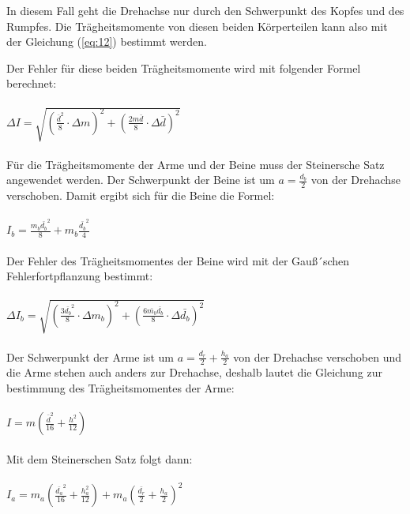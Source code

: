 In diesem Fall geht die Drehachse nur durch den Schwerpunkt des Kopfes und des Rumpfes.
Die Trägheitsmomente von diesen beiden Körperteilen kann also mit der Gleichung (\ref{eq:12})
bestimmt werden.

Der Fehler für diese beiden Trägheitsmomente wird mit folgender Formel berechnet:\\\\

$\Delta I = \sqrt{\left(\frac{\bar{d}^2}{8} \cdot \Delta m \right)^2
  + \left(\frac{2m\bar{d}}{8} \cdot \Delta \bar{d} \right)^2}$\\\\

Für die Trägheitsmomente der Arme und der Beine muss der Steinersche Satz angewendet
werden. Der Schwerpunkt der Beine ist um $a = \frac{d_b}{2}$ von der Drehachse verschoben.
Damit ergibt sich für die Beine die Formel:\\\\

$I_b = \frac{m_b \bar{d_b}^2}{8} + m_b \frac{\bar{d_b}^2}{4}$\\\\

Der Fehler des Trägheitsmomentes der Beine wird mit der Gauß´schen Fehlerfortpflanzung
bestimmt: \\\\

$\Delta I_b = \sqrt{\left(\frac{3\bar{d_b}^2}{8} \cdot \Delta m_b \right)^2
  + \left(\frac{6\bar{m_b}\bar{d_b}}{8} \cdot \Delta \bar{d_b} \right)^2}$\\\\

Der Schwerpunkt der Arme ist um $a = \frac{d_r}{2} + \frac{h_a}{2}$ von der Drehachse verschoben
und die Arme stehen auch anders zur Drehachse, deshalb lautet die Gleichung zur
bestimmung des Trägheitsmomentes der Arme: \\\\

$I = m \left( \frac{\bar{d}^2}{16} + \frac{h^2}{12} \right)$\\\\

Mit dem Steinerschen Satz folgt dann:\\\\

$I_a = m_a \left( \frac{\bar{d_a}^2}{16} + \frac{h_a^2}{12} \right)
+ m_a \left(\frac{\bar{d_r}}{2} + \frac{h_a}{2}\right)^2$ \\\\

